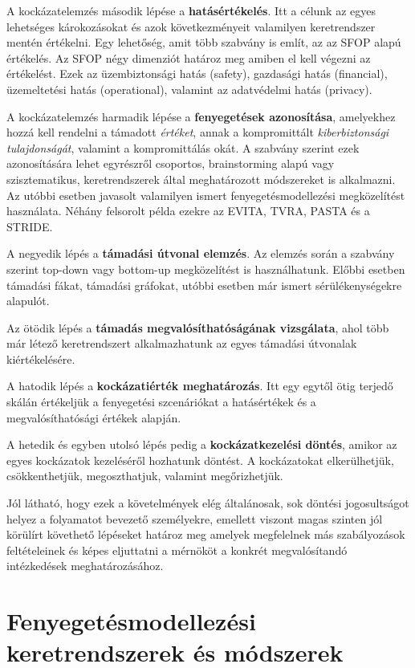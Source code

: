 A kockázatelemzés második lépése a \textbf{hatásértékelés}. Itt a célunk az egyes lehetséges károkozásokat és azok következményeit valamilyen keretrendszer mentén értékelni. Egy lehetőség, amit több szabvány is említ, az az SFOP alapú értékelés. Az SFOP négy dimenziót határoz meg amiben el kell végezni az értékelést. Ezek az üzembiztonsági hatás (safety), gazdasági hatás (financial), üzemeltetési hatás (operational), valamint az adatvédelmi hatás (privacy).

A kockázatelemzés harmadik lépése a \textbf{fenyegetések azonosítása}, amelyekhez hozzá kell rendelni a támadott \textit{értéket}, annak a kompromittált \textit{kiberbiztonsági tulajdonságát}, valamint a kompromittálás okát. A szabvány szerint ezek azonosítására lehet egyrészről csoportos, brainstorming alapú vagy szisztematikus, keretrendszerek által meghatározott módszereket is alkalmazni. Az utóbbi esetben javasolt valamilyen ismert fenyegetésmodellezési megközelítést használata. Néhány felsorolt példa ezekre az EVITA, TVRA, PASTA és a STRIDE.

A negyedik lépés a \textbf{támadási útvonal elemzés}. Az elemzés során a szabvány szerint top-down vagy bottom-up megközelítést is használhatunk. Előbbi esetben támadási fákat, támadási gráfokat, utóbbi esetben már ismert sérülékenységekre alapulót.

Az ötödik lépés a \textbf{támadás megvalósíthatóságának vizsgálata}, ahol több már létező keretrendszert alkalmazhatunk az egyes támadási útvonalak kiértékelésére. 

A hatodik lépés a \textbf{kockázatiérték meghatározás}. Itt egy egytől ötig terjedő skálán értékeljük a fenyegetési szcenáriókat a hatásértékek és a megvalósíthatósági értékek alapján.

A hetedik és egyben utolsó lépés pedig a \textbf{kockázatkezelési döntés}, amikor az egyes kockázatok kezeléséről hozhatunk döntést. A kockázatokat elkerülhetjük, csökkenthetjük, megoszthatjuk, valamint megőrizhetjük.

Jól látható, hogy ezek a követelmények elég általánosak, sok döntési jogosultságot helyez a folyamatot bevezető személyekre, emellett viszont magas szinten jól körülírt követhető lépéseket határoz meg amelyek megfelelnek más szabályozások feltételeinek és képes eljuttatni a mérnököt a konkrét megvalósítandó intézkedések meghatározásához. 

\section{Fenyegetésmodellezési keretrendszerek és módszerek}

